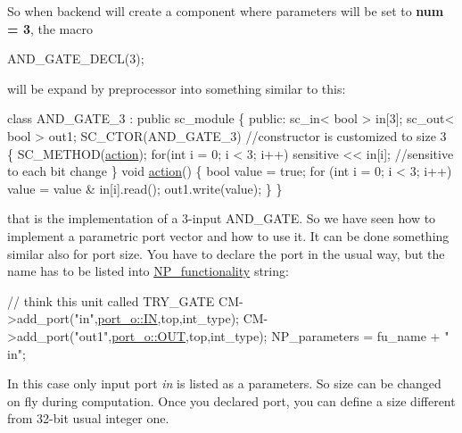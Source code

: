  So when backend will create a component where parameters will be set to {\bfseries num = 3}, the macro 
\begin{DoxyCode}
AND\_GATE\_DECL(3);
\end{DoxyCode}
 will be expand by preprocessor into something similar to this\+: 
\begin{DoxyCode}
\textcolor{keyword}{class }AND\_GATE\_3 : \textcolor{keyword}{public} sc\_module
\{
\textcolor{keyword}{public}:
  sc\_in< bool > in[3];
  sc\_out< bool > out1;
  SC\_CTOR(AND\_GATE\_3)                \textcolor{comment}{//constructor is customized to size 3}
  \{
    SC\_METHOD(\hyperlink{namespacetest__panda_a164944f1df8c7c37365132a9aef1facf}{action});
    \textcolor{keywordflow}{for}(\textcolor{keywordtype}{int} i = 0; i < 3; i++)
      sensitive << in[i];                   \textcolor{comment}{//sensitive to each bit change}
  \}
  \textcolor{keywordtype}{void} \hyperlink{namespacetest__panda_a164944f1df8c7c37365132a9aef1facf}{action}()
  \{
    \textcolor{keywordtype}{bool} value = \textcolor{keyword}{true};
    \textcolor{keywordflow}{for} (\textcolor{keywordtype}{int} i = 0; i < 3; i++)
        value = value & in[i].read();
    out1.write(value);
  \}
\}
\end{DoxyCode}
 that is the implementation of a 3-\/input A\+N\+D\+\_\+\+G\+A\+TE. So we have seen how to implement a parametric port vector and how to use it. It can be done something similar also for port size. You have to declare the port in the usual way, but the name has to be listed into \hyperlink{classNP__functionality}{N\+P\+\_\+functionality} string\+: 
\begin{DoxyCode}
\textcolor{comment}{// think this unit called TRY\_GATE}
CM->add\_port(\textcolor{stringliteral}{"in"},\hyperlink{structport__o_adb254df5665ff28b0769491cc3899fd5aa135fbd4d182c73be50d31f88e981284}{port\_o::IN},top,int\_type);
CM->add\_port(\textcolor{stringliteral}{"out1"},\hyperlink{structport__o_adb254df5665ff28b0769491cc3899fd5ab3bfd4c2f6c68477c8c78a747e879f18}{port\_o::OUT},top,int\_type);
NP\_parameters = fu\_name + \textcolor{stringliteral}{" in"};
\end{DoxyCode}
 In this case only input port {\itshape in} is listed as a parameters. So size can be changed on fly during computation. Once you declared port, you can define a size different from 32-\/bit usual integer one. 
